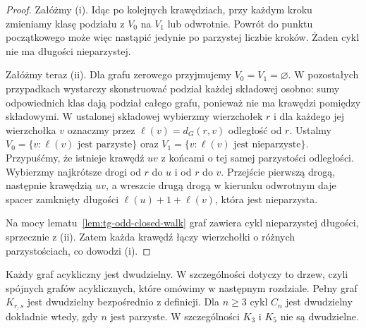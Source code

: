 \begin{proof}
Załóżmy (i). Idąc po kolejnych krawędziach, przy
każdym kroku zmieniamy klasę podziału z $V_0$ na
$V_1$ lub odwrotnie. Powrót do punktu początkowego
może więc nastąpić jedynie po parzystej liczbie
kroków. Żaden cykl nie ma długości nieparzystej.

Załóżmy teraz (ii). Dla grafu zerowego przyjmujemy
$V_0=V_1=\varnothing$. W pozostałych przypadkach
wystarczy skonstruować podział każdej składowej osobno:
sumy odpowiednich klas dają podział całego grafu,
ponieważ nie ma krawędzi pomiędzy składowymi.
W ustalonej składowej wybierzmy wierzchołek $r$
i dla każdego jej wierzchołka $v$ oznaczmy przez
$\ell(v)=d_G(r,v)$ odległość od $r$. Ustalmy
$V_0=\{v:\ell(v)\text{ jest parzyste}\}$
oraz $V_1=\{v:\ell(v)\text{ jest nieparzyste}\}$.
Przypuśćmy, że istnieje krawędź $uv$ z końcami
o tej samej parzystości odległości. Wybierzmy najkrótsze drogi od $r$ do $u$ i od $r$ do $v$.
Przejście pierwszą drogą, następnie krawędzią $uv$, a wreszcie
drugą drogą w kierunku odwrotnym daje spacer zamknięty
długości $\ell(u)+1+\ell(v)$, która jest nieparzysta.

Na mocy lematu~\ref{lem:tg-odd-closed-walk} graf zawiera
cykl nieparzystej długości, sprzecznie z (ii).
Zatem każda krawędź łączy wierzchołki o
różnych parzystościach, co dowodzi (i).
\end{proof}

\begin{center}
\end{center}

\begin{przyklad}
Każdy graf acykliczny jest dwudzielny. W szczególności
dotyczy to drzew, czyli spójnych grafów acyklicznych,
które omówimy w następnym rozdziale. Pełny graf $K_{r,s}$ jest dwudzielny bezpośrednio
z definicji. Dla $n\ge3$ cykl $C_n$ jest dwudzielny
dokładnie wtedy, gdy $n$ jest parzyste. W szczególności
$K_3$ i $K_5$ nie są dwudzielne.
\end{przyklad}

